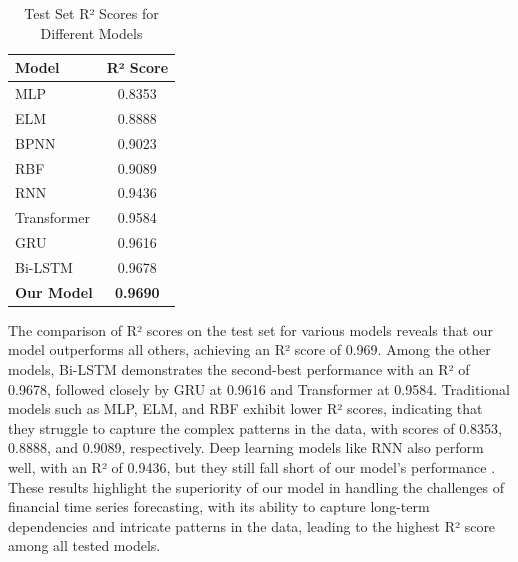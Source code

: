 \documentclass[conference]{IEEEtran}
\begin{document}
\begin{table}[ht]
    \centering
    \begin{tabular}{l c}
        \toprule
        \textbf{Model} & \textbf{R² Score} \\
        \midrule
        MLP            & 0.8353            \\
        ELM            & 0.8888            \\
        BPNN           & 0.9023            \\
        RBF            & 0.9089            \\
        RNN            & 0.9436            \\
        Transformer    & 0.9584            \\
        GRU            & 0.9616            \\
        Bi-LSTM        & 0.9678            \\
        \textbf{Our Model} & \textbf{0.9690} \\
        \bottomrule
    \end{tabular}
    \caption{Test Set R² Scores for Different Models}
    \label{tab:r2_scores}
\end{table}

The comparison of R² scores on the test set for various models reveals that our model outperforms all others, achieving an R² score of 0.969. Among the other models, Bi-LSTM demonstrates the second-best performance with an R² of 0.9678, followed closely by GRU at 0.9616 and Transformer at 0.9584. Traditional models such as MLP, ELM, and RBF exhibit lower R² scores, indicating that they struggle to capture the complex patterns in the data, with scores of 0.8353, 0.8888, and 0.9089, respectively. Deep learning models like RNN also perform well, with an R² of 0.9436, but they still fall short of our model's performance \cite{b21}. These results highlight the superiority of our model in handling the challenges of financial time series forecasting, with its ability to capture long-term dependencies and intricate patterns in the data, leading to the highest R² score among all tested models.
\end{document}
